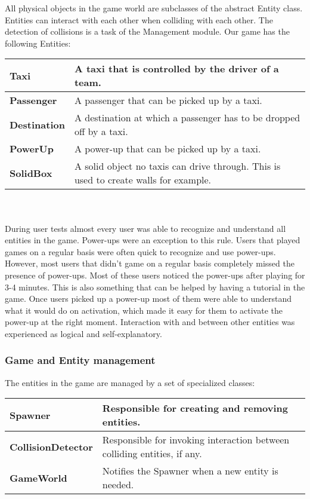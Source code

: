 {All physical objects in the game world are subclasses of the abstract Entity class. Entities can interact with each other when colliding with each other. The detection of collisions is a task of the Management module. Our game has the following Entities:\\

\begin{tabular}{| l | l |} 
\hline
\textbf{Taxi} & A taxi that is controlled by the driver of a team. \\ \hline
\textbf{Passenger} & A passenger that can be picked up by a taxi. \\ \hline
\textbf{Destination} & A destination at which a passenger has to be dropped off by a taxi. \\ \hline 
\textbf{PowerUp} & A power-up that can be picked up by a taxi. \\ \hline
\textbf{SolidBox} & A solid object no taxis can drive through. This is used to create walls for example. \\ \hline
\end{tabular}\\ \\ 

During user tests almost every user was able to recognize and understand all entities  in the game. Power-ups were an exception to this rule. Users that played games on a regular basis were often quick to recognize and use power-ups. However, most users that didn't game on a regular basis  completely missed the presence of power-ups. Most of these users noticed the power-ups after playing for 3-4 minutes. This is also something that can be helped by having a tutorial in the game. Once users picked up a power-up most of them were able to understand what it would do on activation, which made it easy for them to activate the power-up at the right moment.  Interaction with and between other entities was experienced as logical and self-explanatory.


\subsubsection{Game and Entity management}

The entities in the game are managed by a set of specialized classes:\\

\begin{tabular}{| l | l |} 
\hline
\textbf{Spawner} & Responsible for creating and removing entities. \\ \hline
\textbf{CollisionDetector}& Responsible for invoking interaction between colliding entities, if any. \\ \hline
\textbf{GameWorld} & Notifies the Spawner when a new entity is needed. \\ \hline
\end{tabular}\\ \\

}
